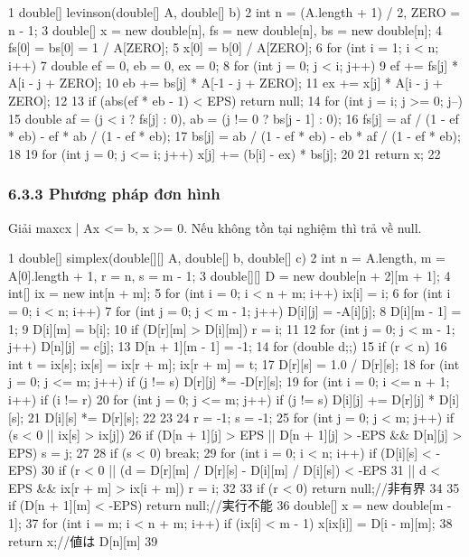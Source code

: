 \documentclass[11pt]{article}
\begin{document}
\begin{Code}
1 double[] levinson(double[] A, double[] b) {
2 int n = (A.length + 1) / 2, ZERO = n - 1;
3 double[] x = new double[n], fs = new double[n], bs = new double[n];
4 fs[0] = bs[0] = 1 / A[ZERO];
5 x[0] = b[0] / A[ZERO];
6 for (int i = 1; i < n; i++) {
7 double ef = 0, eb = 0, ex = 0;
8 for (int j = 0; j < i; j++) {
9 ef += fs[j] * A[i - j + ZERO];
10 eb += bs[j] * A[-1 - j + ZERO];
11 ex += x[j] * A[i - j + ZERO];
12 }
13 if (abs(ef * eb - 1) < EPS) return null;
14 for (int j = i; j >= 0; j--) {
15 double af = (j < i ? fs[j] : 0), ab = (j != 0 ? bs[j - 1] : 0);
16 fs[j] = af / (1 - ef * eb) - ef * ab / (1 - ef * eb);
17 bs[j] = ab / (1 - ef * eb) - eb * af / (1 - ef * eb);
18 }
19 for (int j = 0; j <= i; j++) x[j] += (b[i] - ex) * bs[j];
20 }
21 return x;
22 }
\end{Code}
\subsubsection{6.3.3 Phương pháp đơn hình}
\begin{NoteBlock}
Giải max{cx | Ax <= b, x >= 0}.
Nếu không tồn tại nghiệm thì trả về null.
\end{NoteBlock}
\begin{Code}
1 double[] simplex(double[][] A, double[] b, double[] c) {
2 int n = A.length, m = A[0].length + 1, r = n, s = m - 1;
3 double[][] D = new double[n + 2][m + 1];
4 int[] ix = new int[n + m];
5 for (int i = 0; i < n + m; i++) ix[i] = i;
6 for (int i = 0; i < n; i++) {
7 for (int j = 0; j < m - 1; j++) D[i][j] = -A[i][j];
8 D[i][m - 1] = 1;
9 D[i][m] = b[i];
10 if (D[r][m] > D[i][m]) r = i;
11 }
12 for (int j = 0; j < m - 1; j++) D[n][j] = c[j];
13 D[n + 1][m - 1] = -1;
14 for (double d;;) {
15 if (r < n) {
16 int t = ix[s]; ix[s] = ix[r + m]; ix[r + m] = t;
17 D[r][s] = 1.0 / D[r][s];
18 for (int j = 0; j <= m; j++) if (j != s) D[r][j] *= -D[r][s];
19 for (int i = 0; i <= n + 1; i++) if (i != r) {
20 for (int j = 0; j <= m; j++) if (j != s) D[i][j] += D[r][j] * D[i][s];
21 D[i][s] *= D[r][s];
22 }
23 }
24 r = -1; s = -1;
25 for (int j = 0; j < m; j++) if (s < 0 || ix[s] > ix[j]) {
26 if (D[n + 1][j] > EPS || D[n + 1][j] > -EPS && D[n][j] > EPS) s = j;
27 }
28 if (s < 0) break;
29 for (int i = 0; i < n; i++) if (D[i][s] < -EPS) {
30 if (r < 0 || (d = D[r][m] / D[r][s] - D[i][m] / D[i][s]) < -EPS
31 || d < EPS && ix[r + m] > ix[i + m]) r = i;
32 }
33 if (r < 0) return null;//非有界
34 }
35 if (D[n + 1][m] < -EPS) return null;//実行不能
36 double[] x = new double[m - 1];
37 for (int i = m; i < n + m; i++) if (ix[i] < m - 1) x[ix[i]] = D[i - m][m];
38 return x;//値は D[n][m]
39 }
\end{Code}
\end{document}
